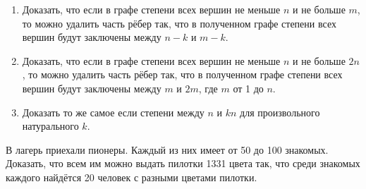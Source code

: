 \begin{thm}
\begin{enumerate}[itemsep=0.05em]
    \item Доказать, что если в графе степени всех вершин не меньше $n$ и не больше $m$, то можно удалить часть рёбер так, что в полученном графе степени всех вершин будут заключены между $n - k$ и $m - k$.
    \item Доказать, что если в графе степени всех вершин не меньше $n$ и не больше $2n$, то можно удалить часть рёбер так, что в полученном графе степени всех вершин будут заключены между $m$ и $2m$, где $m$ от 1 до $n$. 
    \item Доказать то же самое если степени между $n$ и $kn$ для произвольного натурального $k$.
\end{enumerate}
\end{thm}

\begin{thm}
    В лагерь приехали пионеры. Каждый из них имеет от 50 до 100 знакомых. Доказать, что всем им можно выдать пилотки 1331 цвета так, что среди знакомых каждого найдётся 20 человек с разными цветами пилотки.
\end{thm}